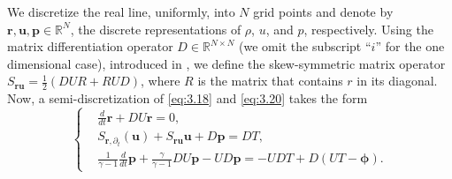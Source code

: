 We discretize the real line, uniformly, into $N$ grid points and denote by $\mathbf r, \mathbf u, \mathbf p \in \mathbb R^{N}$, the discrete representations of $\rho$, $u$, and $p$, respectively. Using the matrix differentiation operator $D\in \mathbb R^{N\times N}$ (we omit the subscript ``$i$'' for the one dimensional case), introduced in , we define the skew-symmetric matrix operator $S_{\mathbf r \mathbf u} = \frac 1 2 (DUR + RUD)$, where $R$ is the matrix that contains $r$ in its diagonal. Now, a semi-discretization of \eqref{eq:3.18} and \eqref{eq:3.20} takes the form
\begin{equation} \label{eq:3.21}
\left\{
\begin{aligned}
	& \frac{d}{dt} \mathbf r + DU\mathbf r = 0, \\
	& S_{\mathbf r,\partial_t} (\mathbf u) + S_{\mathbf r \mathbf u} \mathbf u + D \mathbf p = D T, \\
	&\frac{1}{\gamma -1} \frac{d}{dt} \mathbf p + \frac{\gamma}{\gamma -1} D U \mathbf p - UD\mathbf p = - UDT + D(UT - \mathbf \phi).
\end{aligned}
\right.
\end{equation}

